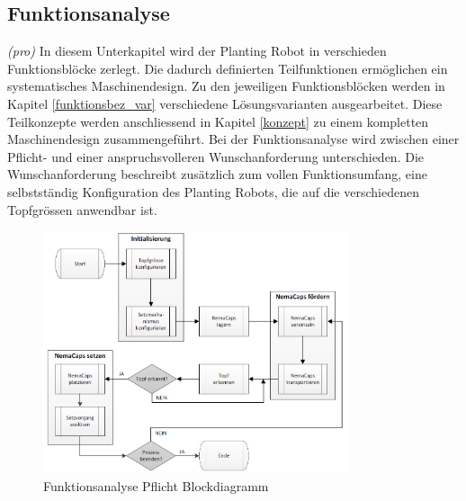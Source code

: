 \subsection{Funktionsanalyse}

\textit{(pro)} In diesem Unterkapitel wird der Planting Robot in verschieden Funktionsblöcke zerlegt. Die dadurch definierten Teilfunktionen ermöglichen ein systematisches Maschinendesign. Zu den jeweiligen Funktionsblöcken werden in Kapitel \ref{funktionsbez_var} verschiedene Lösungsvarianten ausgearbeitet. Diese Teilkonzepte werden anschliessend in Kapitel \ref{konzept} zu einem kompletten Maschinendesign zusammengeführt.\newline
Bei der Funktionsanalyse wird zwischen einer Pflicht- und einer anspruchsvolleren  Wunschanforderung unterschieden. Die Wunschanforderung beschreibt zusätzlich zum vollen Funktionsumfang, eine selbstständig Konfiguration des Planting Robots, die auf die verschiedenen Topfgrössen anwendbar ist.

\begin{figure}[H]
	\includegraphics[width=0.8\textwidth]{Illustrationen/4-Entwurf/Funktionsanalyse_Pflicht.png}
	\caption{Funktionsanalyse Pflicht Blockdiagramm}
	\label{fig:FunktPflicht}
\end{figure}

